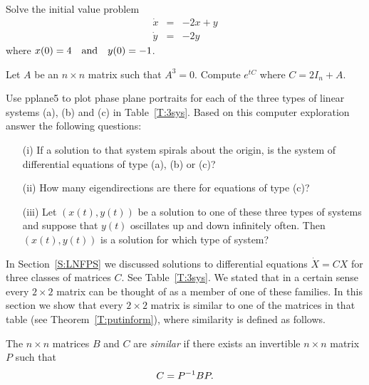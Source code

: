\begin{exercise} \label{c6.3.2}
Solve the initial value problem
\[
\begin{array}{rcr}
\dot{x} & = & -2x + y \\
\dot{y} & = & -2y
\end{array}
\]
where $x(0) = 4  \quad\mbox{and}\quad y(0) = -1$.
\end{exercise}

\begin{exercise} \label{c6.3.25}
Let $A$ be an $n\times n$ matrix such that $A^3=0$.  Compute $e^{tC}$
where $C=2I_n+A$.
\end{exercise}

\CEXER

\begin{exercise} \label{c6.3.3}
Use {\sf pplane5} to plot phase plane portraits for each of the
three types of linear systems (a), (b) and (c) in Table~\ref{T:3sys}.
Based on this computer exploration answer the following questions:
\begin{itemize}
\item[(i)]  If a solution to that system spirals about the origin,
is the system of differential equations of type (a), (b) or (c)?
\item[(ii)]  How many eigendirections are there for equations of type (c)?
\item[(iii)]  Let $(x(t),y(t))$ be a solution to one of these three types of
systems and suppose that $y(t)$ oscillates up and down infinitely often.
Then $(x(t),y(t))$ is a solution for which type of system?
\end{itemize}
\end{exercise}



 \label{S:6.5}

In Section~\ref{S:LNFPS} we discussed solutions to differential equations
$\dot{X}=CX$ for three classes of matrices $C$.  See Table~\ref{T:3sys}.
We stated that in a certain sense every $2\times 2$ matrix can be
thought of as a member of one of these families.  In this section we
show that every $2\times 2$ matrix is similar to one of the matrices in that
table (see Theorem~\ref{T:putinform}), where similarity is defined as follows.

\begin{Def}  \label{D:similar}
The $n\times n$ matrices $B$ and $C$ are {\em similar\/} if
there exists an invertible $n\times n$ matrix $P$ such that
\[
C = P^{-1} BP.
\]
\end{Def}  

